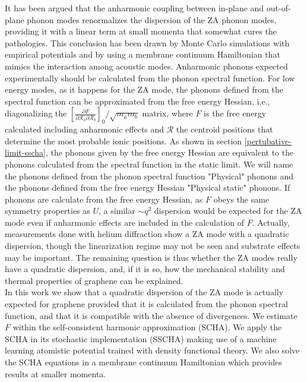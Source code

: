 It has been argued\cite{wang2016anharmonic,los2009scaling,katsnelson2013graphene,zakharchenko2009finite,mariani2008flexural,amorim2014thermodynamics,de2012bending} that the anharmonic coupling between in-plane and out-of-plane phonon 
modes renormalizes the dispersion of the ZA phonon modes, providing it with a linear term at small momenta that 
somewhat cures the pathologies. This conclusion has been drawn by Monte Carlo simulations with empirical 
potentials\cite{wang2016anharmonic,los2009scaling,katsnelson2013graphene,zakharchenko2009finite} and by using a 
membrane continuum  Hamiltonian that mimics the interaction among acoustic 
modes\cite{mariani2008flexural,amorim2014thermodynamics,de2012bending}. Anharmonic phonons expected experimentally 
should be calculated from the phonon spectral function. For low energy modes, as it happens for the ZA mode, the 
phonons defined from the spectral function can be approximated from the
free energy Hessian, i.e., diagonalizing the  $[\frac{\partial F}{\partial \mathcal{R}_a \partial \mathcal{R}_b}]_{0}/\sqrt{m_am_b}$ matrix, where $F$ is the free energy calculated including anharmonic 
effects and $\boldsymbol{\mathcal{R}}$ the centroid positions that determine the most probable ionic 
positions\cite{bianco2017second}. As shown in section \ref{pertubative-limit-sscha}, the phonons given by the free 
energy Hessian are equivalent to the phonons calculated from the spectral function in the static limit. We will name 
the phonons defined from the phonon spectral function "Physical" phonons and the phonons defined from the free 
energy Hessian "Physical static" phonons. 
If phonons are calculate from the free energy Hessian, as $F$ obeys the same symmetry properties as $U$, a similar 
$\sim q^2$ dispersion would be expected for the ZA mode even if anharmonic effects are included in the calculation 
of $F$. Actually, measurements done with helium diffraction show a ZA mode with a quadratic 
dispersion\cite{al2016acoustic,al2015helium,al2018resolving}, though the linearization regime may not be seen and 
substrate effects may be important. The remaining question is thus whether the ZA modes really have a quadratic 
dispersion, and, if it is so, how the mechanical stability and thermal properties of graphene can be explained. \\

In this work we show that a quadratic dispersion of the ZA mode is actually expected for graphene provided that it 
is calculated from the phonon spectral function, and that it is compatible with the absence of 
divergences. We estimate $F$ within the self-consistent harmonic approximation (SCHA). We apply the SCHA in its 
stochastic implementation (SSCHA) making use of a machine learning atomistic potential trained with density 
functional theory\cite{rowe2018development}. We also solve the SCHA equations in a membrane continuum Hamiltonian 
which provides results at smaller momenta.


